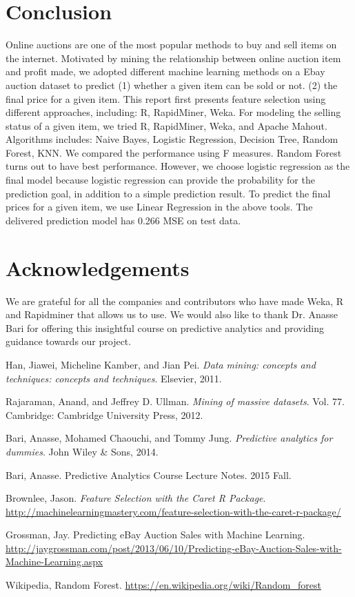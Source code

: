 \documentclass[CEJM,PDF]{cej} %
\begin{document}
\section{Conclusion}
Online auctions are one of the most popular methods to buy and sell items on the internet. Motivated by mining the relationship between online auction item and profit made, we adopted different machine learning methods on a Ebay auction dataset to predict (1) whether a given item can be sold or not. (2) the final price for a given item. This report first presents feature selection using different approaches, including: R, RapidMiner, Weka. For modeling the selling status of a given item, we tried R, RapidMiner, Weka, and Apache Mahout. Algorithms includes: Naive Bayes, Logistic Regression, Decision Tree, Random Forest, KNN. We compared the performance using F measures. Random Forest turns out to have best performance. However, we choose logistic regression as the final model because logistic regression can provide the probability for the prediction goal, in addition to a simple prediction result. To predict the final prices for a given item, we use Linear Regression in the above tools. The delivered prediction model has 0.266 MSE on test data.


\section*{Acknowledgements}

We are grateful for all the companies and contributors who have made Weka, R and Rapidminer that allows us to use. We would also like to thank Dr. Anasse Bari for offering this insightful course on predictive analytics and providing guidance towards our project.


\begin{thebibliography}{9}

Han, Jiawei, Micheline Kamber, and Jian Pei.\textit{ Data mining: concepts and techniques: concepts and techniques}. Elsevier, 2011.

 Rajaraman, Anand, and Jeffrey D. Ullman. \textit{Mining of massive datasets}. Vol. 77. Cambridge: Cambridge University Press, 2012.

 Bari, Anasse, Mohamed Chaouchi, and Tommy Jung. \textit{Predictive analytics for dummies}. John Wiley \& Sons, 2014.	

 Bari, Anasse. Predictive Analytics Course Lecture Notes. 2015 Fall.

  Brownlee, Jason. \textit{Feature Selection with the Caret R Package}. \url{http://machinelearningmastery.com/feature-selection-with-the-caret-r-package/}

 Grossman, Jay. Predicting eBay Auction Sales with Machine Learning. \url{http://jaygrossman.com/post/2013/06/10/Predicting-eBay-Auction-Sales-with-Machine-Learning.aspx}

 Wikipedia, Random Forest. \url{https://en.wikipedia.org/wiki/Random\_forest}

\end{thebibliography}
\end{document}
